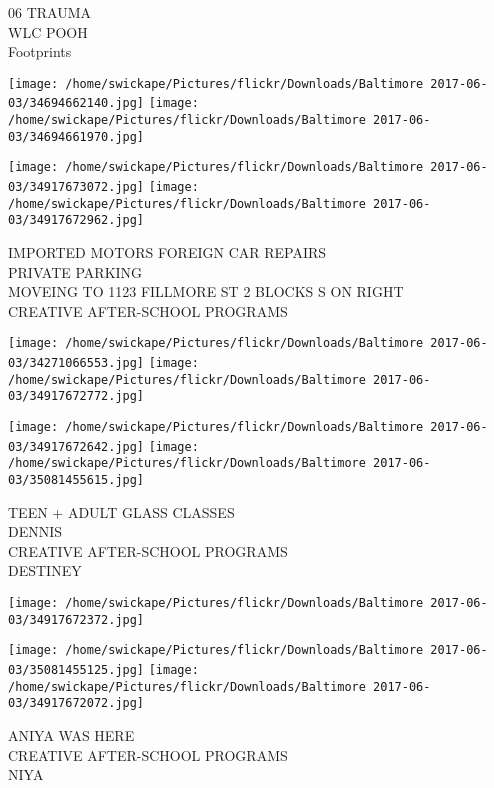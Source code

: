 \documentclass[10pt,letterpaper]{article}
\begin{document}
06 TRAUMA\\
WLC POOH\\
Footprints\\
\pagebreak

\texttt{[image: /home/swickape/Pictures/flickr/Downloads/Baltimore 2017-06-03/34694662140.jpg]}
\texttt{[image: /home/swickape/Pictures/flickr/Downloads/Baltimore 2017-06-03/34694661970.jpg]}

\texttt{[image: /home/swickape/Pictures/flickr/Downloads/Baltimore 2017-06-03/34917673072.jpg]}
\texttt{[image: /home/swickape/Pictures/flickr/Downloads/Baltimore 2017-06-03/34917672962.jpg]}

IMPORTED MOTORS FOREIGN CAR REPAIRS\\
PRIVATE PARKING\\
MOVEING TO 1123 FILLMORE ST 2 BLOCKS S ON RIGHT\\
CREATIVE AFTER{-}SCHOOL PROGRAMS\\
\pagebreak

\texttt{[image: /home/swickape/Pictures/flickr/Downloads/Baltimore 2017-06-03/34271066553.jpg]}
\texttt{[image: /home/swickape/Pictures/flickr/Downloads/Baltimore 2017-06-03/34917672772.jpg]}

\texttt{[image: /home/swickape/Pictures/flickr/Downloads/Baltimore 2017-06-03/34917672642.jpg]}
\texttt{[image: /home/swickape/Pictures/flickr/Downloads/Baltimore 2017-06-03/35081455615.jpg]}

TEEN + ADULT GLASS CLASSES\\
DENNIS\\
CREATIVE AFTER{-}SCHOOL PROGRAMS\\
DESTINEY\\
\pagebreak

\texttt{[image: /home/swickape/Pictures/flickr/Downloads/Baltimore 2017-06-03/34917672372.jpg]}

\vspace{0.25in}
\texttt{[image: /home/swickape/Pictures/flickr/Downloads/Baltimore 2017-06-03/35081455125.jpg]}
\texttt{[image: /home/swickape/Pictures/flickr/Downloads/Baltimore 2017-06-03/34917672072.jpg]}

ANIYA WAS HERE\\
CREATIVE AFTER{-}SCHOOL PROGRAMS\\
NIYA\\
\pagebreak
\end{document}
